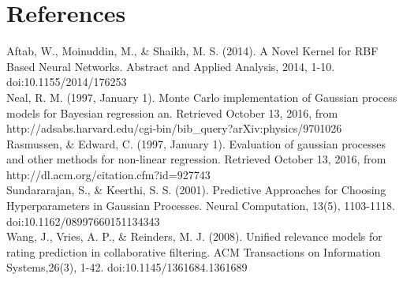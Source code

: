 \documentclass[letterpaper]{article}
\begin{document}
\section{References}

Aftab, W., Moinuddin, M., \& Shaikh, M. S. (2014). A Novel Kernel for RBF Based Neural Networks. Abstract and Applied Analysis, 2014, 1-10. doi:10.1155/2014/176253\\

Neal, R. M. (1997, January 1). Monte Carlo implementation of Gaussian process models for Bayesian regression an. Retrieved October 13, 2016, from http://adsabs.harvard.edu/cgi-bin/bib\_query?arXiv:physics/9701026\\

Rasmussen, \& Edward, C. (1997, January 1). Evaluation of gaussian processes and other methods for non-linear regression. Retrieved October 13, 2016, from http://dl.acm.org/citation.cfm?id=927743\\


Sundararajan, S., \& Keerthi, S. S. (2001). Predictive Approaches for Choosing Hyperparameters in Gaussian Processes. Neural Computation, 13(5), 1103-1118. doi:10.1162/08997660151134343\\

Wang, J., Vries, A. P., \& Reinders, M. J. (2008). Unified relevance models for rating prediction in collaborative filtering. ACM Transactions on Information Systems,26(3), 1-42. doi:10.1145/1361684.1361689\\
\end{document}
